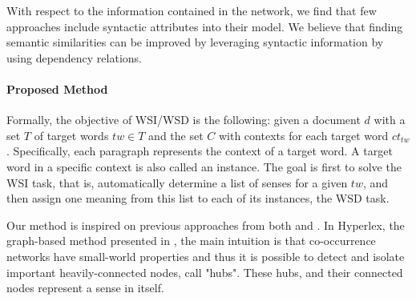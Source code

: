 With respect to the information contained in the network, we find that few approaches include syntactic attributes into their model. We believe that finding semantic similarities can be improved by leveraging syntactic information by using dependency relations. 




\paragraph{Proposed Method}
	


Formally, the objective of WSI/WSD is the following: given a document $d$ with a set $T$ of  target words $tw \in T$ and the set $C$ with contexts for each target word $ct_{tw}$. 
Specifically, each paragraph represents the context  of a target word. A target word in a specific context is also called an instance.
The goal is first to solve the WSI task, that is, automatically determine a list of senses for a given $tw$, and then assign one meaning from this list to each of its instances, the WSD task.
%


Our method  is inspired on previous approaches from both \cite{2004.Veronis} and \cite{2007.Klapaftis.UOY}. In Hyperlex,  the graph-based  method presented  in \cite{2004.Veronis}, the main intuition is that co-occurrence networks have small-world properties and thus it is possible to detect and isolate important heavily-connected nodes, call "hubs". These hubs, and their connected nodes represent a sense in itself. 

